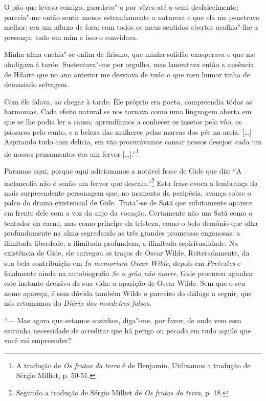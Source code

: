 O pão que levava comigo, guardava"-o por vêzes até o semi desfalecimento;
parecia"-me então sentir menos estranhamente a natureza e que ela me
penetrava melhor; era um afluxo de fora; com todos os meus sentidos
abertos acolhia"-lhe a presença; tudo em mim a isso o convidava.

Minha alma enchia"-se enfim de lirismo, que minha solidão exasperava e
que me afadigava à tarde. Sustentava"-me por orgulho, mas lamentava então
a ausência de Hilaire que no ano anterior me desviava de tudo o que meu
humor tinha de demasiado selvagem.

Com êle falava, ao chegar à tarde. Êle próprio era poeta, compreendia
tôdas as harmonias. Cada efeito natural se nos tornava como uma
linguagem aberta em que se lhe podia ler a causa; aprendíamos a conhecer
os insetos pelo vôo, os pássaros pelo canto, e a beleza das mulheres
pelas marcas dos pés na areia. {[}\ldots{}{]} Aspirando tudo com delícia, em
vão procurávamos cansar nossos desejos; cada um de nossos pensamentos
era um fervor {[}\ldots{}{]}.''\footnote{A tradução de \emph{Os frutos da
  terra} é de Benjamin. Utilizamos a tradução de Sérgio Milliet,
  p. 50-51. \versal{[N. T.]}}

Paramos aqui, porque aqui adicionamos a notável frase de Gide que diz:
``A melancolia não é senão um fervor que descaiu.''\footnote{Segundo a tradução de Sérgio Milliet de \emph{Os frutos da terra},
  p. 18. \versal{[N. T.]}} Esta frase evoca a lembrança da mais surpreendente personagem
que, no momento da peripécia, avança sobre o palco do drama existencial de
Gide. Trata"-se de Satã que subitamente aparece em frente dele com a voz do anjo da
vocação. Certamente não um Satã como o tentador da carne, mas
como príncipe da tristeza, como o belo demônio que olha profundamente na
alma segredando as três grandes promessas enganosas: a ilimitada liberdade,
a ilimitada profundeza, a ilimitada espiritualidade.
Na existência de Gide, ele carregou os traços de Oscar Wilde. Reiteradamente,
da sua bela contribuição em \emph{In memoriam Oscar Wilde}, depois em
\emph{Pretextes} e finalmente ainda na autobiografia \emph{Se o grão não
morre}, Gide procurou apanhar este instante decisivo da sua vida: a
aparição de Oscar Wilde. Sem que o seu nome apareça, é sem dúvida também
Wilde o parceiro do diálogo a seguir, que nós retomamos do \emph{Diário
dos moedeiros falsos}.

``--- Mas agora que estamos sozinhos, diga"-me, por favor, de onde vem essa
estranha necessidade de acreditar que há perigo ou pecado em tudo aquilo
que você vai empreender?

